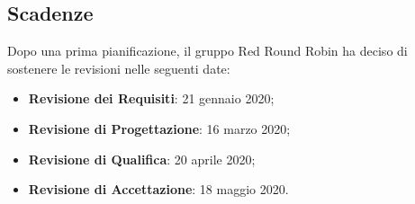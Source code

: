 	\subsection{Scadenze}
	\label{riferimento_scadenze}
		Dopo una prima pianificazione, il gruppo Red Round Robin ha deciso di sostenere le revisioni nelle seguenti date:
		\begin{itemize}
			\item \textbf{Revisione dei Requisiti}: 21 gennaio 2020;
			\item \textbf{Revisione di Progettazione}: 16 marzo 2020;
			\item \textbf{Revisione di Qualifica}: 20 aprile 2020;
			\item \textbf{Revisione di Accettazione}: 18 maggio 2020.
		\end{itemize}

